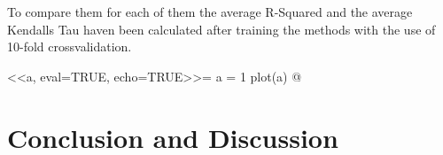 \documentclass[a4paper]{article}
\begin{document}
To compare them for each of them the average R-Squared and the average Kendalls Tau haven been calculated after training the methods with the use of 10-fold crossvalidation.


<<a, eval=TRUE, echo=TRUE>>=
  a = 1
  plot(a)
@

\section{Conclusion and Discussion}
\label{sec:conclusion}

\FloatBarrier


\end{document}
